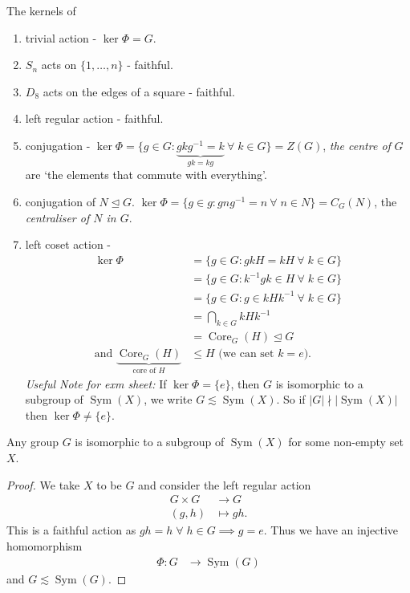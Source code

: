 \begin{example}
The kernels of 
    \begin{enumerate}
        \item trivial action - $\ker \Phi = G$.
        \item $S_n$ acts on $\{1, \dots, n\}$ - faithful.
        \item $D_8$ acts on the edges of a square - faithful.
        \item left regular action - faithful.
        \item conjugation - $\ker \Phi = \{g \in G : \underbrace{g k g^{-1} = k}_{gk = kg} \ \forall \; k \in G\} = Z(G)$, \emph{the centre of} $G$ are `the elements that commute with everything'.
        \item conjugation of $N \trianglelefteq G$. $\ker \Phi = \{ g \in g : g n g^{-1} = n \ \forall \; n \in N\} = C_G(N)$, the \emph{centraliser of $N$ in $G$}.
        \item left coset action -
        \begin{align*}
            \ker \Phi &= \{ g \in G: g kH = kH \ \forall \; k \in G\} \\
            &= \{ g \in G: k^{-1}gk \in H \ \forall \; k \in G\} \\
            &= \{g \in G : g \in k H k^{-1} \ \forall \; k \in G\} \\
            &= \bigcap_{k \in G} k H k^{-1}  \\
            &= \operatorname{Core}_G(H) \trianglelefteq G \\
            \text{and } \underbrace{\operatorname{Core}_G(H)}_\text{core of $H$} &\leq H \text{ (we can set $k = e$)}.
        \end{align*} 
        \emph{Useful Note for exm sheet:} If $\ker \Phi = \{ e \}$, then $G$ is isomorphic to a subgroup of $\operatorname{Sym}(X)$, we write $G \lesssim \operatorname{Sym}(X)$.
        So if $|G| \nmid |\operatorname{Sym}(X)|$ then $\ker \Phi \neq \{e\}$.
    \end{enumerate} 
\end{example} 

\begin{theorem} \label{thm:7}
    Any group $G$ is isomorphic to a subgroup of $\operatorname{Sym}(X)$ for some non-empty set $X$.
\end{theorem} 

\begin{proof}
    We take $X$ to be $G$ and consider the left regular action
    \begin{align*}
        G \times G &\to G \\
        (g, h) &\mapsto gh.
    \end{align*} 
    This is a faithful action as $gh = h \; \forall \; h \in G \implies g = e$.
    Thus we have an injective homomorphism 
    \begin{align*}
        \Phi : G &\to \operatorname{Sym}(G)
    \end{align*} and $G \lesssim \operatorname{Sym}(G)$.
\end{proof} 

